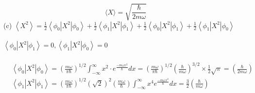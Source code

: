 \begin{enumerate}
\begin{answer}
$$\langle X\rangle=\sqrt{\frac{\hbar}{2 m \omega}}$$
(c) $\left\langle X^{2}\right\rangle=\frac{1}{2}\left\langle\phi_{0}\left|X^{2}\right| \phi_{0}\right\rangle+\frac{1}{2}\left\langle\phi_{1}\left|X^{2}\right| \phi_{1}\right\rangle+\frac{1}{2}\left\langle\phi_{0}\left|X^{2}\right| \phi_{1}\right\rangle+\frac{1}{2}\left\langle\phi_{1}\left|X^{2}\right| \phi_{0}\right\rangle$\\\\
$\left\langle\phi_{0}\left|X^{2}\right| \phi_{1}\right\rangle=0,\left\langle\phi_{1}\left|X^{2}\right| \phi_{0}\right\rangle=0$	\\\\
\begin{align*}
	&\left\langle\phi_{0}\left|X^{2}\right| \phi_{0}\right\rangle=\left(\frac{m \omega}{\pi \hbar}\right)^{1 / 2} \int_{-\infty}^{\infty} x^{2} \cdot e^{\frac{-m \omega x^{2}}{\hbar}} d x=\left(\frac{m \omega}{\pi \hbar}\right)^{1 / 2}\left(\frac{\hbar}{m \omega}\right)^{3 / 2} \times \frac{1}{2} \sqrt{\pi}=\left(\frac{\hbar}{2 m \omega}\right) \\
	&\left\langle\phi_{1}\left|X^{2}\right| \phi_{1}\right\rangle=\left(\frac{m \omega}{\pi \hbar}\right)^{1 / 2}(\sqrt{2})^{2}\left(\frac{m \omega}{\hbar}\right) \int_{-\infty}^{\infty} x^{4} e^{\frac{-m \omega x^{2}}{\hbar}} d x=\frac{3}{2}\left(\frac{\hbar}{m \omega}\right)
\end{align*}


\end{answer}
\end{enumerate}
